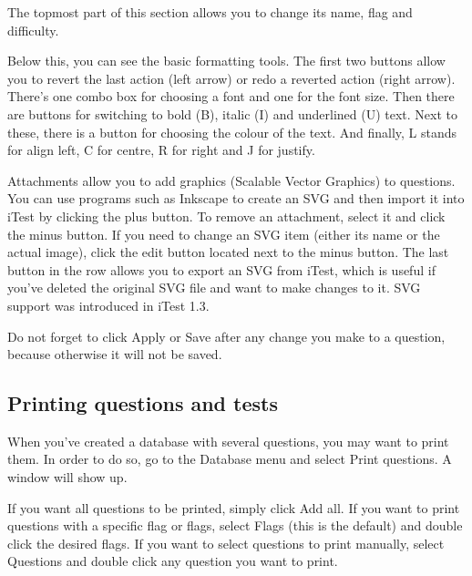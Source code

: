 
The topmost part of this section allows you to change its name, flag and difficulty.


Below this, you can see the basic formatting tools.
The first two buttons allow you to revert the last action (left arrow) or redo a reverted action (right arrow).
There's one combo box for choosing a font and one for the font size.
Then there are buttons for switching to bold (B), italic (I) and underlined (U) text.
Next to these, there is a button for choosing the colour of the text.
And finally, L stands for align left, C for centre, R for right and J for justify.


Attachments allow you to add graphics (Scalable Vector Graphics) to questions.
You can use programs such as Inkscape to create an SVG and then import it into iTest by clicking the plus button.
To remove an attachment, select it and click the minus button.
If you need to change an SVG item (either its name or the actual image), click the edit button located next to the minus button.
The last button in the row allows you to export an SVG from iTest, which is useful if you've deleted the original SVG file and want to make changes to it.
SVG support was introduced in iTest 1.3.


Do not forget to click Apply or Save after any change you make to a question, because otherwise it will not be saved.

\subsection{Printing questions and tests}

When you've created a database with several questions, you may want to print them.
In order to do so, go to the Database menu and select Print questions.
A window will show up.


If you want all questions to be printed, simply click Add all.
If you want to print questions with a specific flag or flags, select Flags (this is the default) and double click the desired flags.
If you want to select questions to print manually, select Questions and double click any question you want to print.

